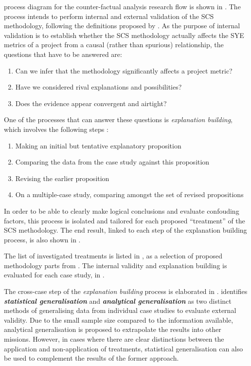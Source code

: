 \documentclass[a4paper,nobib,justified,final]{tufte-book}
\begin{document}
 process diagram for the counter-factual analysis research flow is shown in . 
The process intends to perform internal and external validation of the \acs{SCS} methodology, following the definitions proposed by \citeauthor{yinCaseStudyResearch2014} \cite[33]{yinCaseStudyResearch2014}. As the purpose of internal validation is to establish whether the \acs{SCS} methodology actually affects the \acs{SYE} metrics of a project from a causal (rather than spurious) relationship, the questions that have to be answered are: \cite{yinCaseStudyResearch2014}
\begin{enumerate}[itemsep=-2ex]
	\item Can we infer that the methodology significantly affects a project metric?
	\item Have we considered rival explanations and possibilities?
	\item Does the evidence appear convergent and airtight?
\end{enumerate}
One of the processes that can answer these questions is \emph{explanation building}, which involves the following steps \cite[120]{yinCaseStudyResearch2014}:
\begin{enumerate}[itemsep=-1ex]
	\item[e1.] Making an initial but tentative explanatory proposition
	\item[e2.] Comparing the data from the case study against this proposition
	\item[e3.] Revising the earlier proposition
	\item[e4.] On a multiple-case study, comparing amongst the set of revised propositions
\end{enumerate}
In order to be able to clearly make logical conclusions and evaluate confouding factors, this process is isolated and tailored for each proposed ``treatment'' of the \acs{SCS} methodology. The end result, linked to each step of the explanation building process, is also shown in .

The list of investigated treatments is listed in , as a selection of proposed methodology parts from . The internal validity and explanation building is evaluated for each case study, in .

The cross-case step of the \emph{explanation building} process is elaborated in . \citeauthor{yinCaseStudyResearch2014} \autocite{yinCaseStudyResearch2014} identifies \textbf{\emph{statistical generalisation}} and \textbf{\emph{analytical generalisation}} as two distinct methods of generalising data from individual case studies to evaluate external validity. Due to the small sample size compared to the information available, analytical generalisation is proposed to extrapolate the results into other missions. However, in cases where there are clear distinctions between the application and non-application of treatments, statistical generalisation can also be used to complement the results of the former approach.
\end{document}
